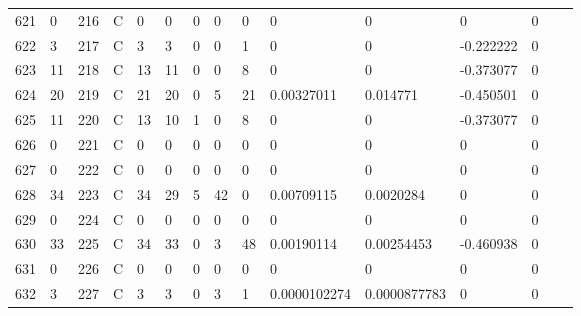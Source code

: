 \begin{longtable}{lllllllllllllll}
	621 & 0                 & 216 & C   & 0                 & 0                 & 0                 & 0    & 0          & 0              & 0              & 0             & 0            \\
	622 & 3                 & 217 & C   & 3                 & 3                 & 0                 & 0    & 1          & 0              & 0              & -0.222222     & 0            \\
	623 & 11                & 218 & C   & 13                & 11                & 0                 & 0    & 8          & 0              & 0              & -0.373077     & 0            \\
	624 & 20                & 219 & C   & 21                & 20                & 0                 & 5    & 21         & 0.00327011     & 0.014771       & -0.450501     & 0            \\
	625 & 11                & 220 & C   & 13                & 10                & 1                 & 0    & 8          & 0              & 0              & -0.373077     & 0            \\
	626 & 0                 & 221 & C   & 0                 & 0                 & 0                 & 0    & 0          & 0              & 0              & 0             & 0            \\
	627 & 0                 & 222 & C   & 0                 & 0                 & 0                 & 0    & 0          & 0              & 0              & 0             & 0            \\
	628 & 34                & 223 & C   & 34                & 29                & 5                 & 42   & 0          & 0.00709115     & 0.0020284      & 0             & 0            \\
	629 & 0                 & 224 & C   & 0                 & 0                 & 0                 & 0    & 0          & 0              & 0              & 0             & 0            \\
	630 & 33                & 225 & C   & 34                & 33                & 0                 & 3    & 48         & 0.00190114     & 0.00254453     & -0.460938     & 0            \\
	631 & 0                 & 226 & C   & 0                 & 0                 & 0                 & 0    & 0          & 0              & 0              & 0             & 0            \\
	632 & 3                 & 227 & C   & 3                 & 3                 & 0                 & 3    & 1          & 0.0000102274   & 0.0000877783   & 0             & 0            \\

\end{longtable}
